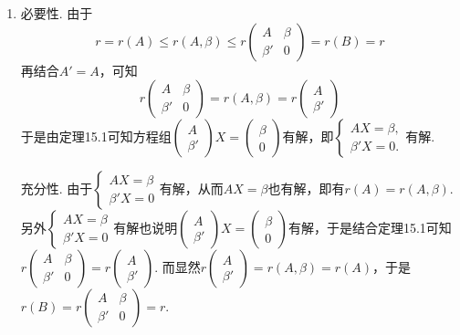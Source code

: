 \begin{enumerate}
\begin{enumerate}
              \item 必要性. 由于
                    \[ r=r(A)\leqslant r(A,\beta)\leqslant r\begin{pmatrix} A & \beta \\ \beta' & 0 \end{pmatrix}=r(B)=r \]
                    再结合$A'=A$，可知
                    \[ r\begin{pmatrix} A & \beta \\ \beta' & 0 \end{pmatrix} =r(A,\beta)=r\begin{pmatrix} A \\ \beta' \end{pmatrix} \]
                    于是由定理15.1可知方程组$\begin{pmatrix} A \\ \beta' \end{pmatrix}X=\begin{pmatrix} \beta \\ 0 \end{pmatrix}$有解，即$\begin{cases} AX=\beta, \\ \beta' X=0. \end{cases}$有解.

                    充分性. 由于$\begin{cases} AX=\beta \\ \beta' X=0 \end{cases}$有解，从而$AX=\beta$也有解，即有$r(A)=r(A,\beta)$. 另外$\begin{cases} AX=\beta \\ \beta' X=0 \end{cases}$有解也说明$\begin{pmatrix} A \\ \beta' \end{pmatrix}X=\begin{pmatrix} \beta \\ 0 \end{pmatrix}$有解，于是结合定理15.1可知$r\begin{pmatrix} A & \beta \\ \beta' & 0 \end{pmatrix}=r\begin{pmatrix} A \\ \beta' \end{pmatrix}$. 而显然$r\begin{pmatrix} A \\ \beta' \end{pmatrix}=r(A,\beta)=r(A)$，于是$r(B)=r\begin{pmatrix} A & \beta \\ \beta' & 0 \end{pmatrix}=r$.


\end{enumerate}
\end{enumerate}
